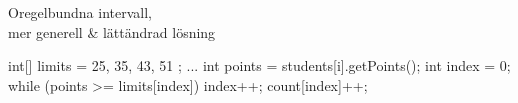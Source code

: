\documentclass{lecturenotes}
\begin{document}
\begin{Slide}{Oregelbundna intervall, \\mer generell \& lättändrad lösning}
\begin{Code}
int[] limits = { 25, 35, 43, 51 };
...
int points = students[i].getPoints();
int index = 0;
while (points >= limits[index]) {
    index++;
}
count[index]++;
\end{Code}
\end{Slide} 


%
%
%
%
%
%
%    
\end{document}
